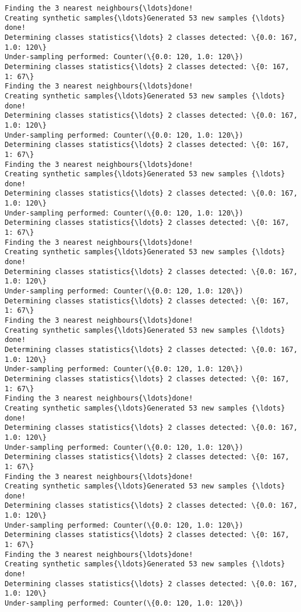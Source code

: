 \documentclass{article}
\begin{document}
\begin{Verbatim}[commandchars=\\\{\}]
Finding the 3 nearest neighbours{\ldots}done!
Creating synthetic samples{\ldots}Generated 53 new samples {\ldots}
done!
Determining classes statistics{\ldots} 2 classes detected: \{0.0: 167, 1.0: 120\}
Under-sampling performed: Counter(\{0.0: 120, 1.0: 120\})
Determining classes statistics{\ldots} 2 classes detected: \{0: 167, 1: 67\}
Finding the 3 nearest neighbours{\ldots}done!
Creating synthetic samples{\ldots}Generated 53 new samples {\ldots}
done!
Determining classes statistics{\ldots} 2 classes detected: \{0.0: 167, 1.0: 120\}
Under-sampling performed: Counter(\{0.0: 120, 1.0: 120\})
Determining classes statistics{\ldots} 2 classes detected: \{0: 167, 1: 67\}
Finding the 3 nearest neighbours{\ldots}done!
Creating synthetic samples{\ldots}Generated 53 new samples {\ldots}
done!
Determining classes statistics{\ldots} 2 classes detected: \{0.0: 167, 1.0: 120\}
Under-sampling performed: Counter(\{0.0: 120, 1.0: 120\})
Determining classes statistics{\ldots} 2 classes detected: \{0: 167, 1: 67\}
Finding the 3 nearest neighbours{\ldots}done!
Creating synthetic samples{\ldots}Generated 53 new samples {\ldots}
done!
Determining classes statistics{\ldots} 2 classes detected: \{0.0: 167, 1.0: 120\}
Under-sampling performed: Counter(\{0.0: 120, 1.0: 120\})
Determining classes statistics{\ldots} 2 classes detected: \{0: 167, 1: 67\}
Finding the 3 nearest neighbours{\ldots}done!
Creating synthetic samples{\ldots}Generated 53 new samples {\ldots}
done!
Determining classes statistics{\ldots} 2 classes detected: \{0.0: 167, 1.0: 120\}
Under-sampling performed: Counter(\{0.0: 120, 1.0: 120\})
Determining classes statistics{\ldots} 2 classes detected: \{0: 167, 1: 67\}
Finding the 3 nearest neighbours{\ldots}done!
Creating synthetic samples{\ldots}Generated 53 new samples {\ldots}
done!
Determining classes statistics{\ldots} 2 classes detected: \{0.0: 167, 1.0: 120\}
Under-sampling performed: Counter(\{0.0: 120, 1.0: 120\})
Determining classes statistics{\ldots} 2 classes detected: \{0: 167, 1: 67\}
Finding the 3 nearest neighbours{\ldots}done!
Creating synthetic samples{\ldots}Generated 53 new samples {\ldots}
done!
Determining classes statistics{\ldots} 2 classes detected: \{0.0: 167, 1.0: 120\}
Under-sampling performed: Counter(\{0.0: 120, 1.0: 120\})
Determining classes statistics{\ldots} 2 classes detected: \{0: 167, 1: 67\}
Finding the 3 nearest neighbours{\ldots}done!
Creating synthetic samples{\ldots}Generated 53 new samples {\ldots}
done!
Determining classes statistics{\ldots} 2 classes detected: \{0.0: 167, 1.0: 120\}
Under-sampling performed: Counter(\{0.0: 120, 1.0: 120\})

\end{Verbatim}
\end{document}
